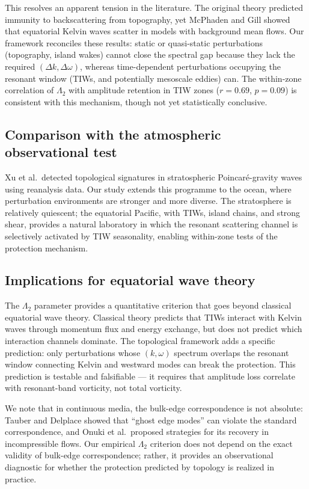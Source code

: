 \documentclass[11pt]{article}
\begin{document}
This resolves an apparent tension in the literature. The original theory predicted immunity to backscattering from topography\cite{Delplace2017}, yet McPhaden and Gill showed that equatorial Kelvin waves scatter in models with background mean flows\cite{McPhaden1987}. Our framework reconciles these results: static or quasi-static perturbations (topography, island wakes) cannot close the spectral gap because they lack the required $(\Delta k, \Delta\omega)$, whereas time-dependent perturbations occupying the resonant window (TIWs, and potentially mesoscale eddies) can. The within-zone correlation of $\Lambda_2$ with amplitude retention in TIW zones ($r = 0.69$, $p = 0.09$) is consistent with this mechanism, though not yet statistically conclusive.

\subsection{Comparison with the atmospheric observational test}

Xu et al.\ detected topological signatures in stratospheric Poincar\'e-gravity waves using reanalysis data\cite{Xu2024}. Our study extends this programme to the ocean, where perturbation environments are stronger and more diverse. The stratosphere is relatively quiescent; the equatorial Pacific, with TIWs, island chains, and strong shear\cite{Kessler2006}, provides a natural laboratory in which the resonant scattering channel is selectively activated by TIW seasonality, enabling within-zone tests of the protection mechanism.

\subsection{Implications for equatorial wave theory}

The $\Lambda_2$ parameter provides a quantitative criterion that goes beyond classical equatorial wave theory. Classical theory predicts that TIWs interact with Kelvin waves through momentum flux and energy exchange\cite{Vallis2017}, but does not predict which interaction channels dominate. The topological framework adds a specific prediction: only perturbations whose $(k, \omega)$ spectrum overlaps the resonant window connecting Kelvin and westward modes can break the protection. This prediction is testable and falsifiable --- it requires that amplitude loss correlate with resonant-band vorticity, not total vorticity.

We note that in continuous media, the bulk-edge correspondence is not absolute: Tauber and Delplace showed that ``ghost edge modes'' can violate the standard correspondence\cite{Tauber2021}, and Onuki et al.\ proposed strategies for its recovery in incompressible flows\cite{Onuki2024}. Our empirical $\Lambda_2$ criterion does not depend on the exact validity of bulk-edge correspondence; rather, it provides an observational diagnostic for whether the protection predicted by topology is realized in practice.
\end{document}
